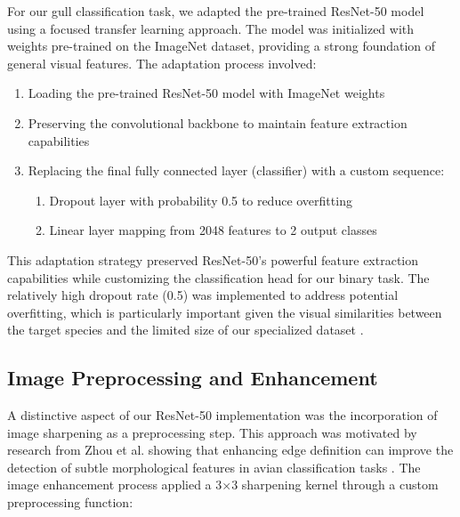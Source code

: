 \documentclass[a4paper,12pt]{article}
\begin{document}
For our gull classification task, we adapted the pre-trained ResNet-50 model using a focused transfer learning approach. The model was initialized with weights pre-trained on the ImageNet dataset, providing a strong foundation of general visual features. The adaptation process involved:

\begin{enumerate}
    \item Loading the pre-trained ResNet-50 model with ImageNet weights
    \item Preserving the convolutional backbone to maintain feature extraction capabilities
    \item Replacing the final fully connected layer (classifier) with a custom sequence:
    \begin{enumerate}
        \item Dropout layer with probability 0.5 to reduce overfitting
        \item Linear layer mapping from 2048 features to 2 output classes
    \end{enumerate}
\end{enumerate}

This adaptation strategy preserved ResNet-50's powerful feature extraction capabilities while customizing the classification head for our binary task. The relatively high dropout rate (0.5) was implemented to address potential overfitting, which is particularly important given the visual similarities between the target species and the limited size of our specialized dataset \citep{srivastava2014dropout}.

\subsection{Image Preprocessing and Enhancement}

A distinctive aspect of our ResNet-50 implementation was the incorporation of image sharpening as a preprocessing step. This approach was motivated by research from Zhou et al. showing that enhancing edge definition can improve the detection of subtle morphological features in avian classification tasks \citep{zhou2022effective}. The image enhancement process applied a 3$\times$3 sharpening kernel through a custom preprocessing function:

\end{document}
